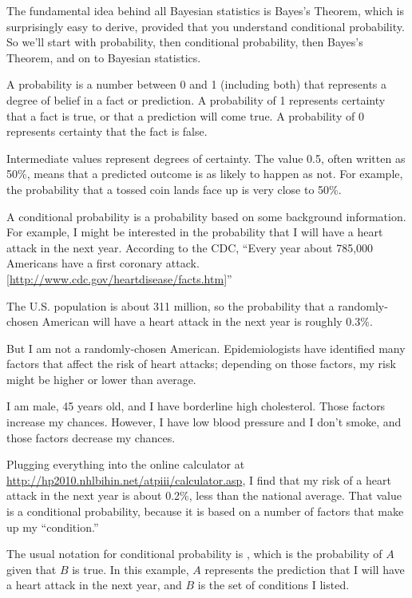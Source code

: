 \documentclass[12pt]{book}
\begin{document}
The fundamental idea behind all Bayesian statistics is Bayes's Theorem,
which is surprisingly easy to derive, provided that you understand
conditional probability.  So we'll start with probability, then
conditional probability, then Bayes's Theorem, and on to Bayesian
statistics.

A probability is a number between 0 and 1 (including both) that
represents a degree of belief in a fact or prediction.  A probability
of 1 represents certainty that a fact is true, or that a prediction
will come true.  A probability of 0 represents certainty
that the fact is false.

Intermediate values represent degrees of certainty.  The value 0.5,
often written as 50\%, means that a predicted outcome is
as likely to happen as not.  For example, the probability that a tossed
coin lands face up is very close to 50\%.

A conditional probability is a probability based on some background
information.  For example, I might be interested in the probability
that I will have a heart attack in the next year.  According to the
CDC, ``Every year about 785,000 Americans have a first coronary attack.
[\url{http://www.cdc.gov/heartdisease/facts.htm}]''

The U.S. population is about 311 million, so the probability that a
randomly-chosen American will have a heart attack in the next year is
roughly 0.3\%.

But I am not a randomly-chosen American.  Epidemiologists have
identified many factors that affect the risk of heart attacks;
depending on those factors, my risk might be higher or lower than
average.

I am male, 45 years old, and I have borderline high cholesterol.
Those factors increase my chances.  However, I have low blood pressure
and I don't smoke, and those factors decrease my chances.

Plugging everything into the online calculator at
\url{http://hp2010.nhlbihin.net/atpiii/calculator.asp}, I find that my
risk of a heart attack in the next year is about 0.2\%, less than the
national average.  That value is a conditional probability, because it
is based on a number of factors that make up my ``condition.''

The usual notation for conditional probability is , which
is the probability of $A$ given that $B$ is true.  In this
example, $A$ represents the prediction that I will have a heart
attack in the next year, and $B$ is the set of conditions I listed.
\end{document}
